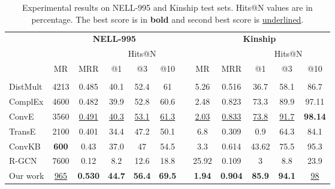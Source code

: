 \documentclass[11pt,a4paper]{article}
\begin{document}
\begin{table*}[t!]
\centering\small
\setlength{\tabcolsep}{4pt} \renewcommand{\arraystretch}{1} \begin{tabular}{lccccclccccc}
\hline
& \multicolumn{5}{c}{\textbf{NELL-995}} &    & \multicolumn{5}{c}{\textbf{Kinship}}    \\ 
\cline{2-6} \cline{8-12}  

&  &  & \multicolumn{3}{c}{Hits@N} &  &  &  & \multicolumn{3}{c}{Hits@N}    \\ 
\cline{4-6} \cline{10-12} 

& MR & MRR & @1 & @3 & @10 &    & MR & MRR & @1 & @3 & @10    \\
\hline
\\
DistMult \cite{yang2014} & 4213 & 0.485 & 40.1 & 52.4 & 61 &    & 5.26 & 0.516 & 36.7 & 58.1 & 86.7   \\

ComplEx \cite{trouillon2016complex} & 4600 & 0.482 & 39.9 & 52.8 & 60.6 &    & 2.48 & 0.823 & 73.3 & 89.9 & 97.11    \\

ConvE \cite{dettmers2018convolutional} & 3560 & \underline{0.491} & \underline{40.3} & \underline{53.1} & \underline{61.3} &    & \underline{2.03} & \underline{0.833} & \underline{73.8} & \underline{91.7} & \textbf{98.14}    \\

TransE \cite{NIPS2013_5071} & 2100 & 0.401 & 34.4 & 47.2 & 50.1 &    & 6.8 & 0.309 & 0.9 & 64.3 & 84.1 
\\

ConvKB \cite{nguyen2018novel} & \textbf{600} & 0.43 & 37.0 & 47 & 54.5 &    & 3.3 & 0.614 & 43.62 & 75.5 & 95.3 
   \\

R-GCN \cite{schlichtkrull2018modeling} & 7600 & 0.12 & 8.2 & 12.6 & 18.8 &    & 25.92 & 0.109 & 3 & 8.8 & 23.9 
\\
   
\hline
Our work & \underline{965} & \textbf{0.530} & \textbf{44.7} & \textbf{56.4} & \textbf{69.5} &    & \textbf{1.94} & \textbf{0.904} & \textbf{85.9} & \textbf{94.1} & \underline{98}  \\

\hline
\end{tabular}
\caption{Experimental results on NELL-995 and Kinship test sets. Hits@N values are in percentage. The best score is in \textbf{bold} and second best score is \underline{underlined}.
  }\label{tb:results2}
\end{table*}
\end{document}
